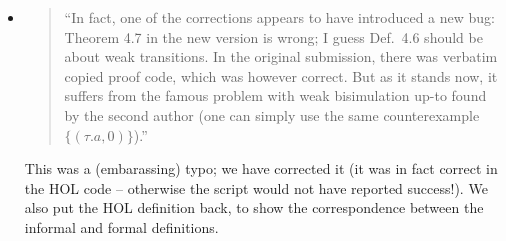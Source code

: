 \begin{itemize}
\item \begin{quote}
    ``In fact, one of the corrections appears to have introduced a new
    bug: Theorem 4.7 in the new version is wrong; I guess Def.~4.6
    should be about weak transitions. In the original submission,
    there was verbatim copied proof code, which was however
    correct. But as it stands now, it suffers from the famous problem
    with weak bisimulation up-to found by the second author (one can
    simply use the same counterexample $\{(\tau. a , 0)\}$).''
  \end{quote}
  \Mark
  This was a (embarassing) typo; we have corrected it (it was in fact correct in the HOL
  code -- otherwise the script would not have reported success!). 
We also put the HOL definition back, to show the correspondence between the informal and formal definitions.



 


\end{itemize}
